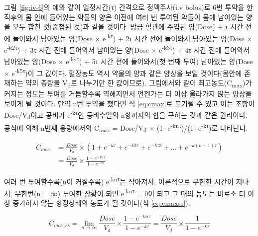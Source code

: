 \documentclass[
  11pt,
  krantz2, a4paper, twoside]{krantz}
\theoremstyle{definition}
\theoremstyle{definition}
\theoremstyle{definition}
\theoremstyle{definition}
\theoremstyle{remark}
\begin{document}
그림 \ref{fig:iv-6}의 예와 같이 일정시간(τ) 간격으로 정맥주사(i.v bolus)로 6번 투약을 한 직후의 몸 안에 들어있는 약물의 양은 이전에 여러 번 투여된 약들이 몸에 남아있는 양을 모두 합친 것(중첩된 것)과 같을 것이다.
방금 혈관에 주입된 양(Dose) + τ 시간 전에 들어와서 남아있는 양(Dose × e\textsuperscript{-kτ}) + 2τ 시간 전에 들어와서 남아있는 양(Dose × e\textsuperscript{-k2τ}) + 3τ 시간 전에 들어와서 남아있는 양(Dose × e\textsuperscript{-k3τ}) + 4τ 시간 전에 들어와서 남아있는 양(Dose × e\textsuperscript{-k4τ}) + 5τ 시간 전에 들어와서(첫 번째 투여) 남아있는 양(Dose × e\textsuperscript{-k5τ})이 그 값이다.
혈장농도 역시 약물의 양과 같은 양상을 보일 것이다(몸안에 존재하는 약의 총량을 V\textsubscript{d}로 나누기만 한 값이므로).
그림에서와 같이 최고농도(C\textsubscript{max})가 커지는 정도는 투여를 거듭할수록 약해지면서 언젠가는 더 이상 올라가지 않는 양상을 보이게 될 것이다.
만약 n번 투약을 했다면 식 \eqref{eq:cmax}로 표기될 수 있고 이는 초항이 Dose/V\textsubscript{d}이고 공비가 e\textsuperscript{-kτ}인 등비수열의 n항까지의 합을 구하는 것과 같은 원리이다.
공식에 의해 n번째 용량에서의 C\textsubscript{max} = Dose/V\textsubscript{d} × (1- e\textsuperscript{-knτ})/(1- e\textsuperscript{-kτ})로 나타난다.

\begin{equation}
\begin{split}
  C_{max} &= \frac{Dose}{V_{d}} \times \left( 1 + e^{- k\tau} + e^{- k2\tau} + e^{- k\tau 3} + \ldots + e^{- k\left( n - 1 \right)\tau} \right)  \\
  &= \frac{Dose}{V_{d}} \times \frac{1 - e^{- kn\tau}}{1 - e^{- k\tau}}
\end{split}
\label{eq:cmax}
\end{equation}

여러 번 투여할수록(n이 커질수록) e\textsuperscript{-knτ}는 작아져서, 이론적으로 무한한 시간이 지나서, 무한번(n = ∞) 투여한 상황이 되면 e\textsuperscript{-knτ} = 0이 되고 그 때의 농도는 비로소 더 이상 증가하지 않는 항정상태의 농도가 될 것이다(식 \eqref{eq:cmaxss}).

\begin{equation}
{C_{max\_ ss} = \lim_{n \rightarrow \infty}}{\frac{{Dose}}{V_{d}} \times \frac{1 - e^{- kn\tau}}{1 - e^{- k\tau}} = \frac{{Dose}}{V_{d}} \times \frac{1}{1 - e^{- k\tau}}}
\label{eq:cmaxss}
\end{equation}
\end{document}
